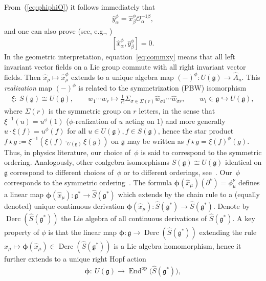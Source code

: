 \documentclass[10pt,a4paper]{amsart}
\def\gg{\mathfrak{g}}
\def\Derc{\operatorname{Derc}}
\def\End{\operatorname{End}}
\def\hx{\hat{x}}
\numberwithin{equation}{section}
\begin{document}
From~(\ref{eq:phiphiO}) it follows immediately that
\begin{gather}\label{eq:yeqxO}
\hat{y}^\phi_\alpha = \hat{x}^\phi_\beta \mathcal{O}^{-1\beta}_\alpha,
\end{gather}
and one can also prove (see, e.g., \cite[Appendix~1]{halg})
\begin{gather}\label{eq:commxy}
[\hat{x}^\phi_\alpha,\hat{y}^\phi_\beta] = 0.
\end{gather}
In the geometric interpretation, equation~\eqref{eq:commxy} means that all left invariant vector fields on a Lie group commute with all right invariant vector fields. Then $\hx_\rho\mapsto\hx_\rho^\phi$ extends to a unique algebra map $(-)^\phi\colon U(\gg)\to\hat{A}_n$. This {\it realization} map $(-)^\phi$ is related to the symmetrization (PBW) isomorphism
\begin{gather*}%
\xi\colon \ S(\gg)\cong U(\gg),\qquad w_1\cdots w_r\mapsto \frac{1}{r!}
\Sigma_{\sigma\in \Sigma(r)} \hat{w}_{\sigma 1}\cdots \hat{w}_{\sigma r}, \qquad w_i\in\gg\hookrightarrow U(\gg),
\end{gather*}
where $\Sigma(r)$ is the symmetric group on $r$ letters, in the sense that $\xi^{-1}(u)= u^\phi(1)$ ($\phi$-realization of $u$ acting on $1$) and more generally $u\cdot\xi(f) = u^\phi(f)$ for all $u\in U(\gg),f\in S(\gg)$, hence the star product $f\star g:=\xi^{-1}(\xi(f)\cdot_{U(\gg)}\xi(g))$ on $\gg$ may be written as $f\star g = \xi(f)^\phi(g)$. Thus, in physics literature, our choice of~$\phi$ is said to correspond to the symmetric ordering. Analogously, other coalgebra isomorphisms $S(\gg)\cong U(\gg)$ identical on $\gg$ correspond to different choices of~$\phi$ or to different orderings, see~\cite{scopr}. Our~$\phi$ corresponds to the symmetric ordering~\cite{ldWeyl}. The formula ${\boldsymbol \phi}(\hat{x}_\mu)(\partial^\nu) = \phi^\nu_\mu$ defines a linear map ${\boldsymbol \phi}(\hat{x}_\mu)\colon \gg^*\to\hat{S}(\gg^*)$ which extends by the chain rule to a (equally denoted) unique continuous derivation ${\boldsymbol \phi}(\hat{x}_\mu)\colon \hat{S}(\gg^*)\to\hat{S}(\gg^*)$. Denote by $\Derc(\hat{S}(\gg^*))$ the Lie algebra of all continuous derivations of $\hat{S}(\gg^*)$. A key property of $\phi$ is that the linear map ${\boldsymbol \phi}\colon \gg\to\Derc(\hat{S}(\gg^*))$ extending the rule $\hat{x}_\mu\mapsto{\boldsymbol \phi}(\hat{x}_\mu)\in\Derc(\hat{S}(\gg^*))$ is a Lie algebra homomorphism, hence it further extends to a unique right Hopf action
\begin{gather*}
{\boldsymbol \phi}\colon \ U(\gg)\to \End^{\mathrm{op}}\big(\hat{S}(\gg^*)\big),
\end{gather*}
\end{document}
